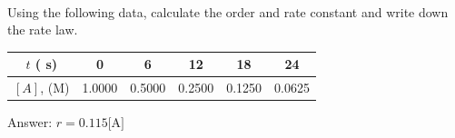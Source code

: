 \documentclass[main.tex]{subfiles}
\begin{document}
\begin{description}
\begin{example}
\faDiamond\ \\
Using the following data, calculate the order and rate constant and write down the rate law.
\begin{center}\begin{tabular}[t]{   c|  c cccc  }
\toprule
  $t$ ( s)	&  0	&6	&12	&18	&24	 \\
  \midrule
  $[A]$, (M)&1.0000	&0.5000	&0.2500	&0.1250	 &0.0625	\\
\bottomrule
\end{tabular}\end{center}
\flushright Answer:  $r=0.115\text{[A]}$
\end{example}%
\end{description}
\newpage
\end{document}
